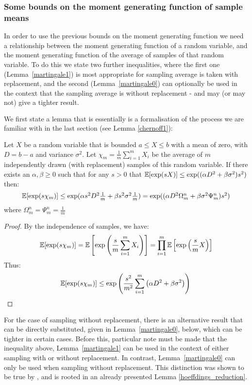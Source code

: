 \subsubsection{Some bounds on the moment generating function of sample means}\label{sec:without_replacement}

In order to use the previous bounds on the moment generating function we need a relationship between the moment generating function of a random variable, and the moment generating function of the average of samples of that random variable.
To do this we state two further inequalities, where the first one (Lemma~\ref{martingale1}) is most appropriate for sampling average is taken with replacement, and the second (Lemma~\ref{martingale0}) can optionally be used in the context that the sampling average is without replacement - and may (or may not) give a tighter result.

We first state a lemma that is essentially is a formalisation of the process we are familiar with in the last section (see Lemma \ref{chernoff1}):

\begin{lemma}\label{martingale1}
Let $X$ be a random variable that is bounded $a\le X\le b$ with a mean of zero, with $D=b-a$ and variance $\sigma^2$.
Let $\chi_m = \frac{1}{m}\sum_{i=1}^mX_i$ be the average of $m$ independently drawn (with replacement) samples of this random variable.
If there exists an $\alpha, \beta \ge 0$ such that for any $s>0$ that $\operatorname{\mathbb{E}}[\exp(sX)]\le\exp((\alpha D^2 +\beta \sigma^2) s^2)$ then:
$$\textstyle\operatorname{\mathbb{E}}[\exp(s\chi_m)]\le\exp(\alpha s^2D^2\frac{1}{m} +\beta s^2\sigma^2 \frac{1}{m}) = \exp((\alpha D^2{\Omega}_m^n +\beta\sigma^2 {\Psi}_m^n)s^2)$$
where ${\Omega}_m^n = {\Psi}_m^n = \frac{1}{m}$
\end{lemma}
\begin{proof} 
By the independence of samples, we have:
\[\operatorname{\mathbb{E}}[\exp(s\chi_m)]=\operatorname{\mathbb{E}}\left[\exp\left(\frac{s}{m}\sum_{i=1}^mX_i\right)\right]=\prod_{i=1}^m\operatorname{\mathbb{E}}\left[\exp\left(\frac{s}{m}X\right)\right]\] 
Thus:
\[\operatorname{\mathbb{E}}[\exp(s\chi_m)] \le \exp\left(\frac{s^2}{m^2}\sum_{i=1}^m\left(\alpha D^2 +\beta \sigma^2\right) \right) \qedhere\]
\end{proof}

For the case of sampling without replacement, there is an alternative result that can be directly substituted, given in Lemma~\ref{martingale0}, below, which can be tighter in certain cases.
Before this, particular note must be made that the inequality above, Lemma~\ref{martingale1} can be used in the context of either sampling with or without replacement.
In contrast, Lemma~\ref{martingale0} can only be used when sampling without replacement. 
This distinction was shown to be true by \cite{hoeffding1}, and is rooted in an already presented Lemma \ref{hoeffdings_reduction}.

